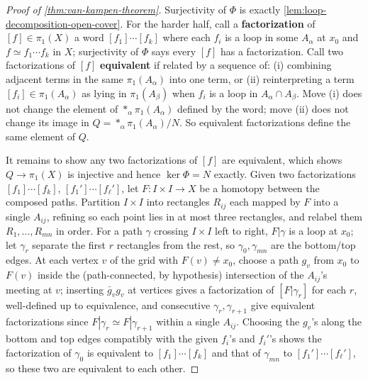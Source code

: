 \begin{proof}[Proof of \cref{thm:van-kampen-theorem}]
Surjectivity of $\Phi$ is exactly \cref{lem:loop-decomposition-open-cover}. For the
harder half, call a \textbf{factorization} of $[f]\in\pi_1(X)$ a word $[f_1]\cdots[f_k]$ where
each $f_i$ is a loop in some $A_\alpha$ at $x_0$ and $f \simeq f_1\cdots f_k$ in $X$; surjectivity of
$\Phi$ says every $[f]$ has a factorization. Call two factorizations of $[f]$
\textbf{equivalent} if related by a sequence of: (i) combining adjacent terms in the same
$\pi_1(A_\alpha)$ into one term, or (ii) reinterpreting a term $[f_i]\in\pi_1(A_\alpha)$ as lying in
$\pi_1(A_\beta)$ when $f_i$ is a loop in $A_\alpha\cap A_\beta$. Move (i) does not change the
element of $*_\alpha\pi_1(A_\alpha)$ defined by the word; move (ii) does not change its image in
$Q = *_\alpha\pi_1(A_\alpha)/N$. So equivalent factorizations define the same element of $Q$.

It remains to show any two factorizations of $[f]$ are equivalent, which shows
$Q \to \pi_1(X)$ is injective and hence $\ker\Phi = N$ exactly. Given two factorizations
$[f_1]\cdots[f_k]$, $[f_1']\cdots[f_\ell']$, let $F : I\times I \to X$ be a homotopy between the
composed paths. Partition $I\times I$ into rectangles $R_{ij}$ each mapped by $F$ into a
single $A_{ij}$, refining so each point lies in at most three rectangles, and relabel them
$R_1,\ldots,R_{mn}$ in order. For a path $\gamma$ crossing $I\times I$ left to right, $F|\gamma$ is a
loop at $x_0$; let $\gamma_r$ separate the first $r$ rectangles from the rest, so $\gamma_0,\gamma_{mn}$
are the bottom/top edges. At each vertex $v$ of the grid with $F(v)\ne x_0$, choose a
path $g_v$ from $x_0$ to $F(v)$ inside the (path-connected, by hypothesis) intersection
of the $A_{ij}$'s meeting at $v$; inserting $\bar g_vg_v$ at vertices gives a factorization of
$[F|\gamma_r]$ for each $r$, well-defined up to equivalence, and consecutive $\gamma_r,\gamma_{r+1}$
give equivalent factorizations since $F|\gamma_r \simeq F|\gamma_{r+1}$ within a single $A_{ij}$. Choosing
the $g_v$'s along the bottom and top edges compatibly with the given $f_i$'s and
$f_i'$'s shows the factorization of $\gamma_0$ is equivalent to $[f_1]\cdots[f_k]$ and that of
$\gamma_{mn}$ to $[f_1']\cdots[f_\ell']$, so these two are equivalent to each other.
\end{proof}

